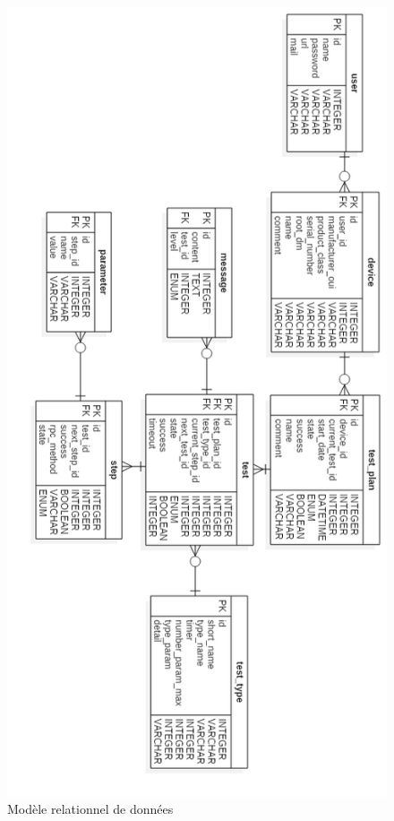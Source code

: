 \documentclass[12pt,a4paper]{report}
\begin{document}
\begin{figure}[!h]
    \center
    \includegraphics[scale=0.78]{./img/db_schema.png}
    \caption{Modèle relationnel de données}
\end{figure}
\end{document}
